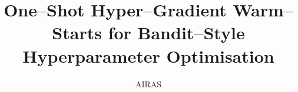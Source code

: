 \usepackage{multirow}
\usepackage{array}
\usepackage{tabularx}
\usepackage{colortbl}
\usepackage{booktabs}

\usepackage{algorithm}
\usepackage{algorithmicx}
\usepackage{algpseudocode}


\usepackage{hyperref}
\usepackage{cleveref}

\usepackage{microtype}

\title{One--Shot Hyper--Gradient Warm--Starts for Bandit--Style Hyperparameter Optimisation}
\author{AIRAS}



\maketitle






